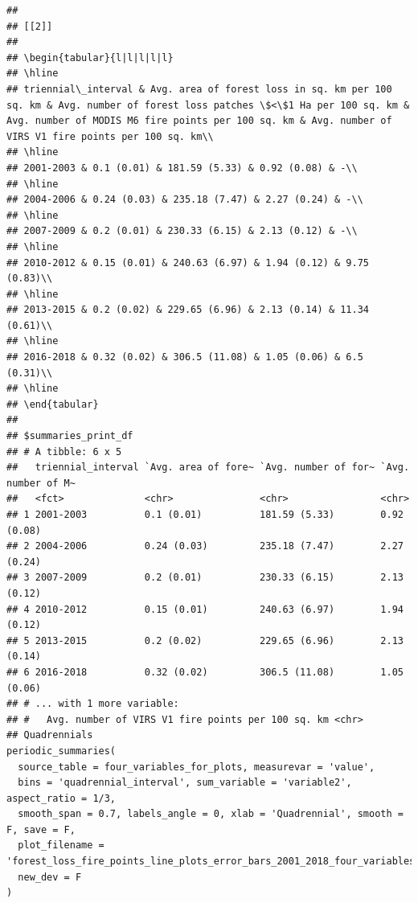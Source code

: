 \documentclass[10pt,landscape,a3paper]{article}
\begin{document}
\begin{verbatim}
## 
## [[2]]
## 
## \begin{tabular}{l|l|l|l|l}
## \hline
## triennial\_interval & Avg. area of forest loss in sq. km per 100 sq. km & Avg. number of forest loss patches \$<\$1 Ha per 100 sq. km & Avg. number of MODIS M6 fire points per 100 sq. km & Avg. number of VIRS V1 fire points per 100 sq. km\\
## \hline
## 2001-2003 & 0.1 (0.01) & 181.59 (5.33) & 0.92 (0.08) & -\\
## \hline
## 2004-2006 & 0.24 (0.03) & 235.18 (7.47) & 2.27 (0.24) & -\\
## \hline
## 2007-2009 & 0.2 (0.01) & 230.33 (6.15) & 2.13 (0.12) & -\\
## \hline
## 2010-2012 & 0.15 (0.01) & 240.63 (6.97) & 1.94 (0.12) & 9.75 (0.83)\\
## \hline
## 2013-2015 & 0.2 (0.02) & 229.65 (6.96) & 2.13 (0.14) & 11.34 (0.61)\\
## \hline
## 2016-2018 & 0.32 (0.02) & 306.5 (11.08) & 1.05 (0.06) & 6.5 (0.31)\\
## \hline
## \end{tabular}
## 
## $summaries_print_df
## # A tibble: 6 x 5
##   triennial_interval `Avg. area of fore~ `Avg. number of for~ `Avg. number of M~
##   <fct>              <chr>               <chr>                <chr>             
## 1 2001-2003          0.1 (0.01)          181.59 (5.33)        0.92 (0.08)       
## 2 2004-2006          0.24 (0.03)         235.18 (7.47)        2.27 (0.24)       
## 3 2007-2009          0.2 (0.01)          230.33 (6.15)        2.13 (0.12)       
## 4 2010-2012          0.15 (0.01)         240.63 (6.97)        1.94 (0.12)       
## 5 2013-2015          0.2 (0.02)          229.65 (6.96)        2.13 (0.14)       
## 6 2016-2018          0.32 (0.02)         306.5 (11.08)        1.05 (0.06)       
## # ... with 1 more variable:
## #   Avg. number of VIRS V1 fire points per 100 sq. km <chr>
## Quadrennials
periodic_summaries(
  source_table = four_variables_for_plots, measurevar = 'value',
  bins = 'quadrennial_interval', sum_variable = 'variable2', aspect_ratio = 1/3,
  smooth_span = 0.7, labels_angle = 0, xlab = 'Quadrennial', smooth = F, save = F,
  plot_filename = 'forest_loss_fire_points_line_plots_error_bars_2001_2018_four_variables_quadrennial.jpg',
  new_dev = F
)
\end{verbatim}
\end{document}
